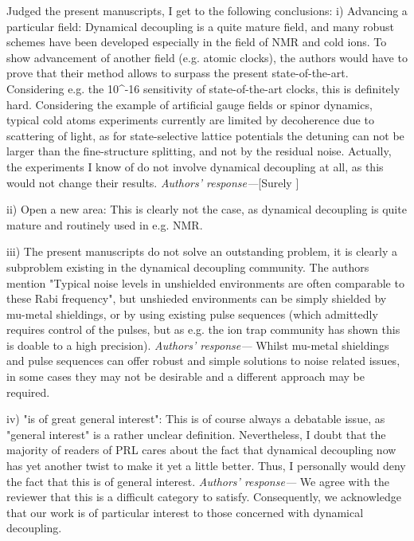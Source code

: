 \documentclass[letterpaper]{article}
\newenvironment{refcomment}{\singlespacing\verbatim}{\endverbatim}
\newcommand{\response}{\emph{Authors' response---}}
\begin{document}
\begin{refcomment}
Judged the present manuscripts, I get to the following conclusions: i)
Advancing a particular field: Dynamical decoupling is a quite mature
field, and many robust schemes have been developed especially in the
field of NMR and cold ions. To show advancement of another field (e.g.
atomic clocks), the authors would have to prove that their method
allows to surpass the present state-of-the-art. Considering e.g. the
10^-16 sensitivity of state-of-the-art clocks, this is definitely
hard. Considering the example of artificial gauge fields or spinor
dynamics, typical cold atoms experiments currently are limited by
decoherence due to scattering of light, as for state-selective lattice
potentials the detuning can not be larger than the fine-structure
splitting, and not by the residual noise. Actually, the experiments I
know of do not involve dynamical decoupling at all, as this would not
change their results.
\end{refcomment}
\response [Surely ]


\begin{refcomment}
ii) Open a new area: This is clearly not the case, as dynamical
decoupling is quite mature and routinely used in e.g. NMR.

iii) The present manuscripts do not solve an outstanding problem, it
is clearly a subproblem existing in the dynamical decoupling
community. The authors mention "Typical noise levels in
unshielded environments are often comparable to these
Rabi frequency", but unshieded environments can be simply shielded
by mu-metal shieldings, or by using existing pulse sequences (which
admittedly requires control of the pulses, but as e.g. the ion trap
community has shown this is doable to a high precision).
\end{refcomment}
\response
Whilst mu-metal shieldings and pulse sequences can offer robust and simple solutions to noise related issues, in some cases they may not be desirable and a different approach may be required. 

\begin{refcomment}
iv) "is of great general interest": This is of course always a
debatable issue, as "general interest" is a rather unclear definition.
Nevertheless, I doubt that the majority of readers of PRL cares about
the fact that dynamical decoupling now has yet another twist to make
it yet a little better. Thus, I personally would deny the fact that
this is of general interest.
\end{refcomment}
\response
We agree with the reviewer that this is a difficult category to satisfy. Consequently, we acknowledge that our work is of particular interest to those concerned with dynamical decoupling.
\end{document}
